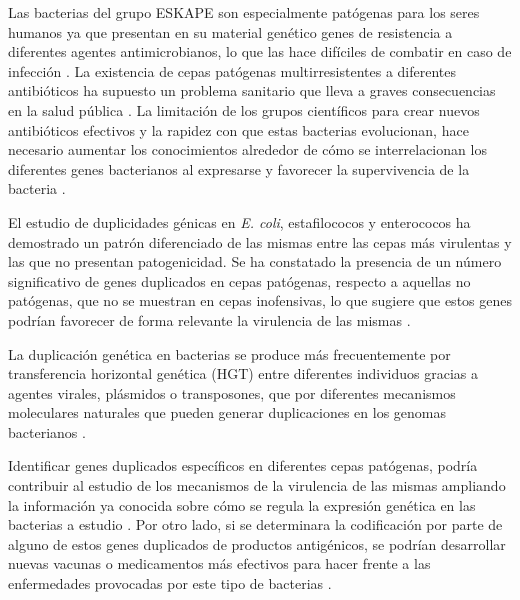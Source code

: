 Las bacterias del grupo ESKAPE son especialmente patógenas para los seres humanos ya que presentan en su material genético genes de resistencia a diferentes agentes antimicrobianos, lo que las hace difíciles de combatir en caso de infección \cite{lipinski_high_2011, santajit_mechanisms_2016}. La existencia de cepas patógenas multirresistentes a diferentes antibióticos ha supuesto un problema sanitario que lleva a graves consecuencias en la salud pública \cite{bernabeu_gene_2019,murray_vancomycin-resistant_2000, pendleton_clinical_2013, sanchez-herrero_gene_2020}. La limitación de los grupos científicos para crear nuevos antibióticos efectivos y la rapidez con que estas bacterias evolucionan, hace necesario aumentar los conocimientos alrededor de cómo se interrelacionan los diferentes genes bacterianos al expresarse y favorecer la supervivencia de la bacteria \cite{bernabeu_gene_2019,pendleton_clinical_2013,santajit_mechanisms_2016}.

El estudio de duplicidades génicas en \textit{E. coli}, estafilococos y enterococos ha demostrado un patrón diferenciado de las mismas entre las cepas más virulentas y las que no presentan patogenicidad. Se ha constatado la presencia de un número significativo de genes duplicados en cepas patógenas, respecto a aquellas no patógenas, que no se muestran en cepas inofensivas, lo que sugiere que estos genes podrían favorecer de forma relevante la virulencia de las mismas \cite{bernabeu_gene_2019,sanchez-herrero_gene_2020}.

La duplicación genética en bacterias se produce más frecuentemente por transferencia horizontal genética (HGT) entre diferentes individuos gracias a agentes virales, plásmidos o transposones, que por diferentes mecanismos moleculares naturales que pueden generar duplicaciones en los genomas bacterianos \cite{reams_mechanisms_2015,romero_gene_1997,sanchez-herrero_gene_2020,santajit_mechanisms_2016}. 

Identificar genes duplicados específicos en diferentes cepas patógenas, podría contribuir al estudio de los mecanismos de la virulencia de las mismas ampliando la información ya conocida sobre cómo se regula la expresión genética en las bacterias a estudio \cite{bernabeu_gene_2019,sanchez-herrero_gene_2020}. Por otro lado, si se determinara la codificación por parte de alguno de estos genes duplicados de productos antigénicos, se podrían desarrollar nuevas vacunas o medicamentos más efectivos para hacer frente a las enfermedades provocadas por este tipo de bacterias \cite{bernabeu_gene_2019, serres_evolution_2009}.

